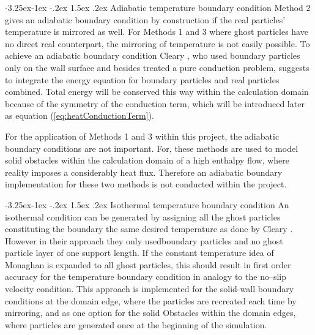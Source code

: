\documentclass{report}
\makeatletter
\renewcommand\paragraph{\@startsection{paragraph}{4}{\z@}%
  {-3.25ex\@plus -1ex \@minus -.2ex}%
  {1.5ex \@plus .2ex}%
  {\normalfont\normalsize\bfseries}}
\makeatother
\begin{document}
\paragraph{Adiabatic temperature boundary condition}
Method 2 gives an adiabatic boundary condition by construction if the real particles' temperature is mirrored as well. 
For Methods 1 and 3 where ghost particles have no direct real counterpart, the mirroring of temperature is not easily possible. To achieve an adiabatic boundary condition Cleary \cite{Cleary1999}, who used boundary particles only on the wall surface and besides treated a pure conduction problem, suggests to integrate the energy equation for boundary particles and real particles combined. Total energy will be conserved this way within the calculation domain because of the symmetry of the conduction term, which will be introduced later as equation (\ref{eq:heatConductionTerm}).

For the application of Methods 1 and 3 within this project, the adiabatic boundary conditions are not important. For, these methods are used to model solid obstacles within the calculation domain of a high enthalpy flow, where reality imposes a considerably heat flux.
Therefore an adiabatic boundary implementation for these two methods is not conducted within the project.

\paragraph{Isothermal temperature boundary condition}
\label{sec:BC_solid_Wall_isothermal}
An isothermal condition can be generated by assigning all the ghost particles constituting the boundary the same desired temperature as done by Cleary \cite{Cleary1999}. However in their approach they only usedboundary particles and no ghost particle layer of one support length. 
If the constant temperature idea of Monaghan is expanded to all ghost particles, this should result in first order accuracy for the temperature boundary condition in analogy to the no--slip velocity condition. This approach is implemented for the solid-wall boundary conditions at the domain edge, where the particles are recreated each time by mirroring, and as one option for the solid Obstacles within the domain edges, where particles are generated once at the beginning of the simulation.
\end{document}
